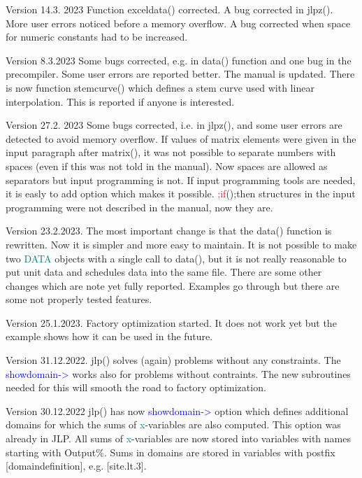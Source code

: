 Version 14.3. 2023 Function \textcolor{VioletRed}{exceldata}() corrected. A bug corrected in \textcolor{VioletRed}{jlpz}(). 
More user errors noticed before a memory overflow. A bug corrected when space 
for numeric constants had to be increased. 
 
Version 8.3.2023 Some bugs corrected, e.g. in \textcolor{VioletRed}{data}() function and one bug in the precompiler. 
Some user errors are reported better. The manual is updated. There is 
now function \textcolor{VioletRed}{stemcurve}() which defines a stem curve used with linear interpolation. 
This is reported if anyone is interested. 
 
Version 27.2. 2023 Some bugs corrected, i.e. in \textcolor{VioletRed}{jlpz}(), and some user errors are detected 
to avoid memory overflow. If values of matrix elements were 
given 
in the input paragraph after \textcolor{VioletRed}{matrix}(), it was not possible to separate numbers with spaces (even if this was not 
told in the manual). Now spaces are allowed as separators but input programming is not. If 
input programming tools are needed, it is easly to add option which makes it possible. \textcolor{Red}{;if}();then 
structures in the input programming were not described in the manual, now they are. 
 
Version 23.2.2023. The most important change is that the \textcolor{VioletRed}{data}() function is rewritten. 
Now it is simpler and more easy to maintain. It is not possible to make two \textcolor{teal}{DATA} objects with 
a single call to \textcolor{VioletRed}{data}(), but it is not really reasonable to put unit data and schedules data 
into the same file. There are some other changes which are note yet fully reported. Examples go through 
but there are some not properly tested features. 
 
Version 25.1.2023. Factory optimization started. It does not work yet 
but the example shows how it can be used in the future. 
 
Version 31.12.2022. \textcolor{VioletRed}{jlp}() solves (again) problems without any constraints. 
The \textcolor{blue}{showdomain->} works also for problems without contraints. The new subroutines needed for this 
will smooth the road to factory optimization. 
 
Version 30.12.2022 \textcolor{VioletRed}{jlp}() has now \textcolor{blue}{showdomain->} option which defines additional domains for which the sums 
of \textcolor{teal}{x}-variables are also computed. This option was already in JLP. 
All sums of \textcolor{teal}{x}-variables are now stored into variables with names starting with Output\%. Sums 
in domains are stored in variables with postfix [domaindefinition], e.g. [site.lt.3]. 
 
